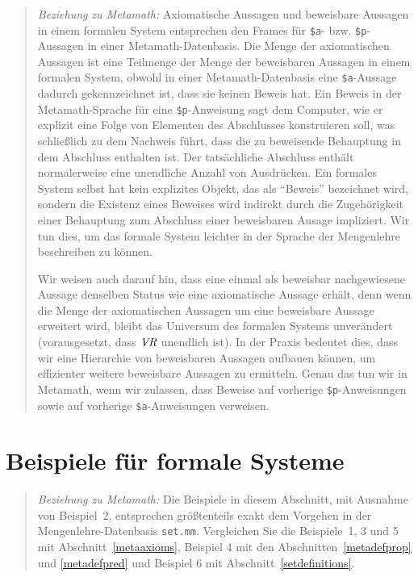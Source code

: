 {\footnotesize\begin{quotation}
{\em Beziehung zu Metamath:} Axiomatische Aussagen und beweisbare Aussagen in einem formalen System entsprechen den Frames für \texttt{\$a}- bzw. \texttt{\$p}-Aussagen in einer Metamath-Datenbasis.  Die Menge der axiomatischen Aussagen ist eine Teilmenge der Menge der beweisbaren Aussagen in einem formalen System, obwohl in einer Metamath-Datenbasis eine \texttt{\$a}-Aussage dadurch gekennzeichnet ist, dass sie keinen Beweis hat.  Ein Beweis in der Metamath-Sprache für eine \texttt{\$p}-Anweisung sagt dem Computer, wie er explizit eine Folge von Elementen des Abschlusses konstruieren soll, was schließlich zu dem Nachweis führt, dass die zu beweisende Behauptung in dem Abschluss enthalten ist.  Der tatsächliche Abschluss enthält normalerweise eine unendliche Anzahl von Ausdrücken.  Ein formales System selbst hat kein explizites Objekt, das als "`Beweis"' bezeichnet wird, sondern die Existenz eines Beweises wird indirekt durch die Zugehörigkeit einer Behauptung zum Abschluss einer beweisbaren Ausage impliziert.  Wir tun dies, um das formale System leichter in der Sprache der Mengenlehre beschreiben zu können.  

Wir weisen auch darauf hin, dass eine einmal als beweisbar nachgewiesene Aussage denselben Status wie eine axiomatische Aussage erhält, denn wenn die Menge der axiomatischen Aussagen um eine beweisbare Aussage erweitert wird, bleibt das Universum des formalen Systems unverändert (vorausgesetzt, dass $\mbox{\em VR}$ unendlich ist). In der Praxis bedeutet dies, dass wir eine Hierarchie von beweisbaren Aussagen aufbauen können, um effizienter weitere beweisbare Aussagen zu ermitteln.  Genau das tun wir in Metamath, wenn wir zulassen, dass Beweise auf vorherige \texttt{\$p}-Anweisungen sowie auf vorherige \texttt{\$a}-Anweisungen verweisen.
\end{quotation}}


\section{Beispiele für formale Systeme}

{\footnotesize\begin{quotation}
{\em Beziehung zu Metamath:} Die Beispiele in diesem Abschnitt, mit Ausnahme von Beispiel~2, entsprechen größtenteils exakt dem Vorgehen in der Mengenlehre-Datenbasis \texttt{set.mm}.  Vergleichen Sie die Beispiele~1, 3 und 5 mit Abschnitt~\ref{metaaxioms}, Beispiel 4 mit den Abschnitten~\ref{metadefprop} und \ref{metadefpred} und Beispiel 6 mit Abschnitt~\ref{setdefinitions}.\label{exampleref}
\end{quotation}}

